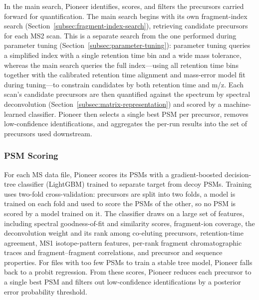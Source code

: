 \documentclass[pdflatex,sn-nature]{sn-jnl}
\begin{document}
In the main search, Pioneer identifies, scores, and filters the precursors carried forward for quantification. The main search begins with its own fragment-index search (Section~\ref{subsec:fragment-index-search}), retrieving candidate precursors for each MS2 scan. This is a separate search from the one performed during parameter tuning (Section~\ref{subsec:parameter-tuning}): parameter tuning queries a simplified index with a single retention time bin and a wide mass tolerance, whereas the main search queries the full index---using all retention time bins together with the calibrated retention time alignment and mass-error model fit during tuning---to constrain candidates by both retention time and m/z. Each scan's candidate precursors are then quantified against the spectrum by spectral deconvolution (Section~\ref{subsec:matrix-representation}) and scored by a machine-learned classifier. Pioneer then selects a single best PSM per precursor, removes low-confidence identifications, and aggregates the per-run results into the set of precursors used downstream.

\subsubsection{PSM Scoring}\label{subsubsec:first-pass-search-scoring}

For each MS data file, Pioneer scores its PSMs with a gradient-boosted decision-tree classifier (LightGBM) trained to separate target from decoy PSMs. Training uses two-fold cross-validation: precursors are split into two folds, a model is trained on each fold and used to score the PSMs of the other, so no PSM is scored by a model trained on it. The classifier draws on a large set of features, including spectral goodness-of-fit and similarity scores, fragment-ion coverage, the deconvolution weight and its rank among co-eluting precursors, retention-time agreement, MS1 isotope-pattern features, per-rank fragment chromatographic traces and fragment--fragment correlations, and precursor and sequence properties. For files with too few PSMs to train a stable tree model, Pioneer falls back to a probit regression. From these scores, Pioneer reduces each precursor to a single best PSM and filters out low-confidence identifications by a posterior error probability threshold.

\end{document}
